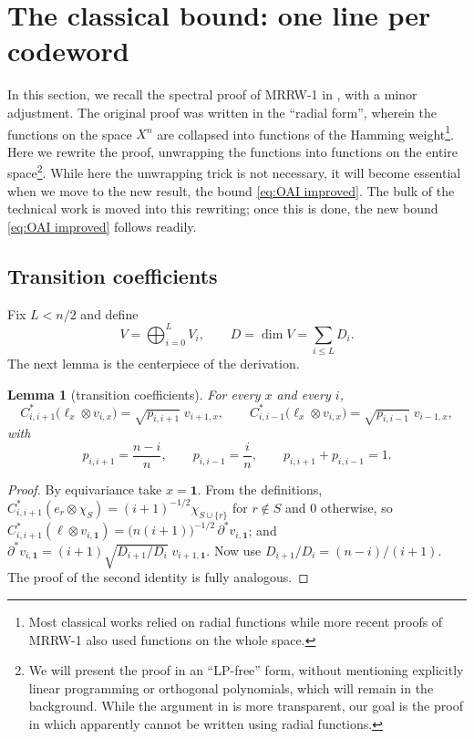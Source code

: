 \documentclass[11pt]{amsart}
\theoremstyle{plain}
\newtheorem{lemma}[theorem]{Lemma}
\theoremstyle{remark}
\begin{document}
\section{The classical bound: one line per codeword}\label{sec:bn06}

In this section, we recall the spectral proof of MRRW-1 in \cite{BN06}, with a minor adjustment. 
The original proof was written in the ``radial form'', wherein the functions on the space $X^n$ are collapsed into functions
of the Hamming weight\footnote{Most classical works relied on radial functions \cite{MRRW77,KabatyanskiiLevenshtein1978} while more recent proofs of MRRW-1 \cite{FT05,NS09} also used functions on the whole space.}. 
Here we rewrite the proof, unwrapping the functions into functions on the entire space\footnote{We will present the proof in an ``LP-free'' form, without mentioning explicitly linear programming or orthogonal polynomials, which will remain in the background. While the argument in \cite{BN06} is more transparent, our goal is the proof in \cite{OAI26} which apparently cannot be written using radial functions.}. While here the unwrapping trick is not necessary, it will become essential when we move to the new result, the bound \eqref{eq:OAI improved}.
The bulk of the technical work is moved into this rewriting; once this is done, the new bound \eqref{eq:OAI improved} follows readily.


\subsection{Transition coefficients}
Fix $L<n/2$ and define
  $$
  V=\bigoplus_{i=0}^{L}V_i, \qquad D=\dim V=\sum_{i\le L}D_i.
  $$
The next lemma is the centerpiece of the derivation.

\begin{lemma}[transition coefficients]\label{lem:contract0}
For every $x$ and every $i$,
\[
 C^{*}_{i,i+1}\bigl(\ell_x\otimes v_{i,x}\bigr)=\sqrt{p_{i,i+1}}\;v_{i+1,x},
 \qquad
 C^{*}_{i,i-1}\bigl(\ell_x\otimes v_{i,x}\bigr)=\sqrt{p_{i,i-1}}\;v_{i-1,x},
\]
with
\[
 p_{i,i+1}=\frac{n-i}{n},\qquad p_{i,i-1}=\frac{i}{n},
 \qquad p_{i,i+1}+p_{i,i-1}=1 .
\]
\end{lemma}

\begin{proof}
By equivariance take $x=\mathbf 1$. From the definitions,
$C^{*}_{i,i+1}(e_r\otimes\chi_S)=(i+1)^{-1/2}\chi_{S\cup\{r\}}$ for
$r\notin S$ and $0$ otherwise, so
$C^{*}_{i,i+1}(\ell\otimes v_{i,\mathbf 1})
=\bigl(n(i+1)\bigr)^{-1/2}\,\partial^{*}v_{i,\mathbf 1}$; and
$\partial^{*}v_{i,\mathbf 1}=(i+1)\sqrt{D_{i+1}/D_i}\;v_{i+1,\mathbf 1}$.
Now use $D_{i+1}/D_i=(n-i)/(i+1)$. The proof of the second identity is fully analogous.
\end{proof}
\end{document}
